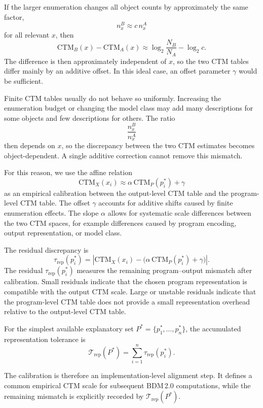 \documentclass{article}
\begin{document}
If the larger enumeration changes all object counts by approximately the same factor,
\[
n_x^B
\approx
c\,n_x^A
\]
for all relevant \(x\), then
\[
\mathrm{CTM}_B(x)-\mathrm{CTM}_A(x)
\approx
\log_2\frac{N_B}{N_A}
-
\log_2c.
\]
The difference is then approximately independent of \(x\), so the two CTM tables differ mainly by an additive offset. In this ideal case, an offset parameter \(\gamma\) would be sufficient.

Finite CTM tables usually do not behave so uniformly. Increasing the enumeration budget or changing the model class may add many descriptions for some objects and few descriptions for others. The ratio
\[
\frac{n_x^B}{n_x^A}
\]
then depends on \(x\), so the discrepancy between the two CTM estimates becomes object-dependent. A single additive correction cannot remove this mismatch.

For this reason, we use the affine relation
\[
\mathrm{CTM}_X(x_i)
\approx
\alpha\,\mathrm{CTM}_P(p_i^*)+\gamma
\]
as an empirical calibration between the output-level CTM table and the program-level CTM table. The offset \(\gamma\) accounts for additive shifts caused by finite enumeration effects. The slope \(\alpha\) allows for systematic scale differences between the two CTM spaces, for example differences caused by program encoding, output representation, or model class.

The residual discrepancy is
\[
\tau_{\mathrm{rep}}(p_i^*)
=
\left|
\mathrm{CTM}_X(x_i)
-
\bigl(\alpha\,\mathrm{CTM}_P(p_i^*)+\gamma\bigr)
\right|.
\]
The residual \(\tau_{\mathrm{rep}}(p_i^*)\) measures the remaining program--output mismatch after calibration. Small residuals indicate that the chosen program representation is compatible with the output CTM scale. Large or unstable residuals indicate that the program-level CTM table does not provide a small representation overhead relative to the output-level CTM table.

For the simplest available explanatory set \(P^*=\{p_1^*,\ldots,p_n^*\}\), the accumulated representation tolerance is
\[
\mathcal T_{\mathrm{rep}}(P^*)
=
\sum_{i=1}^{n}
\tau_{\mathrm{rep}}(p_i^*).
\]

The calibration is therefore an implementation-level alignment step. It defines a common empirical CTM scale for subsequent BDM\,2.0 computations, while the remaining mismatch is explicitly recorded by \(\mathcal T_{\mathrm{rep}}(P^*)\).
\end{document}
